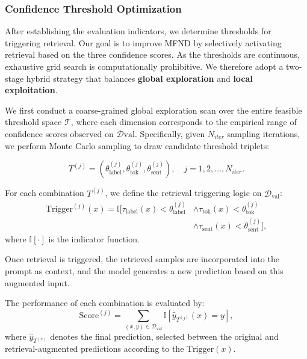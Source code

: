 \subsubsection{Confidence Threshold Optimization}
After establishing the evaluation indicators, we determine thresholds for triggering retrieval. Our goal is to improve MFND by selectively activating retrieval based on the three confidence scores. As the thresholds are continuous, exhaustive grid search is computationally prohibitive. We therefore adopt a two-stage hybrid strategy that balances \textbf{global exploration} and \textbf{local exploitation}.

We first conduct a coarse-grained global exploration scan over the entire feasible threshold space $\mathcal{T}$, where each dimension corresponds to the empirical range of confidence scores observed on $\mathcal{D}{\text{val}}$. Specifically, given $N_{iter}$ sampling iterations, we perform Monte Carlo sampling to draw candidate threshold triplets:

\begin{equation}
T^{(j)} = \left( \theta^{(j)}_{\text{label}}, \theta^{(j)}_{\text{tok}} ,\theta^{(j)}_{\text{sent}} \right), \quad j = 1, 2, \ldots, N_{iter}.
\end{equation}

For each combination $T^{(j)}$, we define the retrieval triggering logic on $\mathcal{D}_{\text{val}}$:
\begin{equation}
\begin{split}
\text{Trigger}^{(j)}(x) = \mathbb{I} \big[ \tau_{\text{label}}(x) < \theta^{(j)}_{\text{label}} &\land \tau_{\text{tok}}(x) < \theta^{(j)}_{\text{tok}}\\
&\land \tau_{\text{sent}}(x) < \theta^{(j)}_{\text{sent}} \big] ,
\end{split}
\end{equation}
where $\mathbb{I}\left[\cdot \right]$ is the indicator function. 

Once retrieval is triggered, the retrieved samples are incorporated into the prompt as context, and the model generates a new prediction based on this augmented input.

The performance of each combination is evaluated by: 
\begin{equation} 
\text{Score}^{(j)} = \sum_{(x, y) \in \mathcal{D}_{\text{val}}} \mathbb{I}[ \hat{y}_{T^{(j)}}(x) = y ],
\end{equation}
where $\hat{y}_{{T}^{(x)}}$ denotes the final prediction, selected between the original and retrieval-augmented predictions according to the $\text{Trigger}(x)$.


